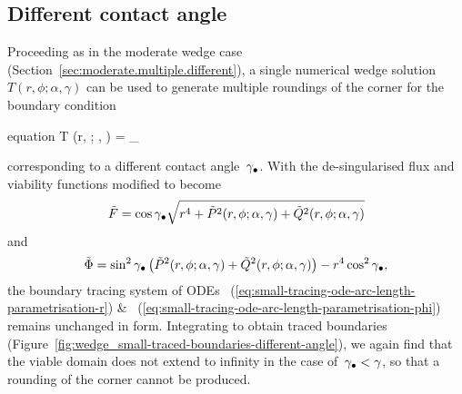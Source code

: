 \subsection{Different contact angle}
\label{sec:small.rounding.different}

Proceeding as in the moderate wedge case
(Section~\ref{sec:moderate.multiple.different}),
a single numerical wedge solution~$T (r, \phi; \alpha, \gamma)$
can be used to generate multiple roundings of the corner
for the boundary condition
\begin{important}{equation}
  \normalvec \dotp \del T (r, \phi; \alpha, \gamma) =
    \cos\gamma_\tr
  \label{eq:small-flux-boundary-condition-different-angle}
\end{important}
corresponding to a different contact angle~$\gamma_\bullet$.
With the de-singularised flux and viability functions
modified to become
\begin{equation}
  \tilde{F} =
    \cos\gamma_\bullet
    \sqrt{
      r^4
      + \tilde{P}^2 (r, \phi; \alpha, \gamma)
      + \tilde{Q}^2 (r, \phi; \alpha, \gamma)
    }
  \label{eq:small-flux-function-de-singularised-different-angle}
\end{equation}
and
\begin{equation}
  \desing{\Phi} =
    \sin^2\gamma_\tr \,
    \roundbr*{
      \desing{P}^2 (r, \phi; \alpha, \gamma)
        +
      \desing{Q}^2 (r, \phi; \alpha, \gamma)
    }
      - r^4 \cos^2\gamma_\tr,
  \label{eq:small-viability-function-de-singularised-different-angle}
\end{equation}
the boundary tracing system of ODEs~%
  (\ref{eq:small-tracing-ode-arc-length-parametrisation-r})
\&~%
  (\ref{eq:small-tracing-ode-arc-length-parametrisation-phi})
remains unchanged in form.
Integrating to obtain traced boundaries
(Figure~\ref{fig:wedge_small-traced-boundaries-different-angle}),
we again find that the viable domain does not extend to infinity
in the case of~$\gamma_\bullet < \gamma$,
so that a rounding of the corner cannot be produced.

